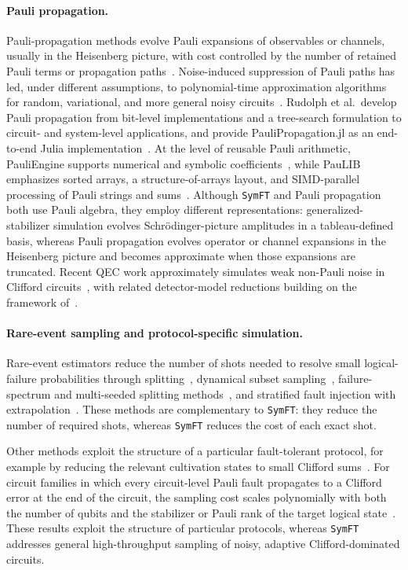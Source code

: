 \documentclass[a4paper,onecolumn,unpublished]{quantumarticle}
\newcommand{\tFont}[1]{\texttt{#1}}
\newcommand{\symft}{\tFont{SymFT}}
\begin{document}
\paragraph{Pauli propagation.}
Pauli-propagation methods evolve Pauli expansions of observables or channels, usually in the Heisenberg picture, with cost controlled by the number of retained Pauli terms or propagation paths~\cite{RLC19}.
Noise-induced suppression of Pauli paths has led, under different assumptions, to polynomial-time approximation algorithms for random, variational, and more general noisy circuits~\cite{AGL+23,SWC+24,FRD+25,SYG+25,GCT25,AMR26}.
Rudolph et al.\ develop Pauli propagation from bit-level implementations and a tree-search formulation to circuit- and system-level applications, and provide PauliPropagation.jl as an end-to-end Julia implementation~\cite{RJT+26}.
At the level of reusable Pauli arithmetic, PauliEngine supports numerical and symbolic coefficients~\cite{MBK26}, while PauLIB emphasizes sorted arrays, a structure-of-arrays layout, and SIMD-parallel processing of Pauli strings and sums~\cite{K26}.
Although \symft{} and Pauli propagation both use Pauli algebra, they employ different representations: generalized-stabilizer simulation evolves Schr\"odinger-picture amplitudes in a tableau-defined basis, whereas Pauli propagation evolves operator or channel expansions in the Heisenberg picture and becomes approximate when those expansions are truncated.
Recent QEC work approximately simulates weak non-Pauli noise in Clifford circuits~\cite{MOH+25,HOR+26}, with related detector-model reductions building on the framework of~\cite{DTB+25}.

\paragraph{Rare-event sampling and protocol-specific simulation.}
Rare-event estimators reduce the number of shots needed to resolve small logical-failure probabilities through splitting~\cite{BV13,MGO25}, dynamical subset sampling~\cite{HWR24}, failure-spectrum and multi-seeded splitting methods~\cite{BCC+25}, and stratified fault injection with extrapolation~\cite{YP26}.
These methods are complementary to \symft{}: they reduce the number of required shots, whereas \symft{} reduces the cost of each exact shot.

Other methods exploit the structure of a particular fault-tolerant protocol, for example by reducing the relevant cultivation states to small Clifford sums~\cite{WZZ26}.
For circuit families in which every circuit-level Pauli fault propagates to a Clifford error at the end of the circuit, the sampling cost scales polynomially with both the number of qubits and the stabilizer or Pauli rank of the target logical state~\cite{SDK26}.
These results exploit the structure of particular protocols, whereas \symft{} addresses general high-throughput sampling of noisy, adaptive Clifford-dominated circuits.
\end{document}
